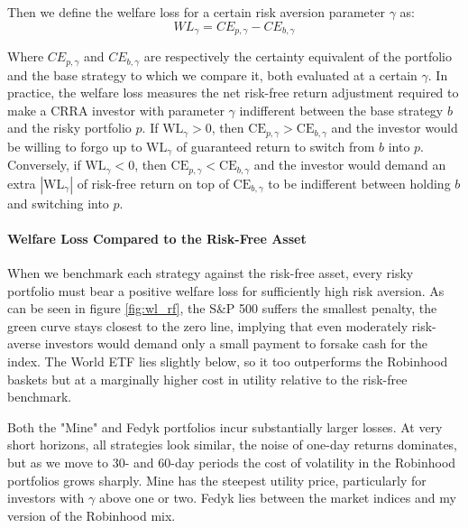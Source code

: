 Then we define the welfare loss for a certain risk aversion parameter $\gamma$ as:
\begin{equation}
    WL_{\gamma} = CE_{p, \gamma} - CE_{b, \gamma}
\end{equation}

Where $CE_{p, \gamma}$ and $CE_{b, \gamma}$ are respectively the certainty equivalent of the portfolio and the base strategy to which we compare it, both evaluated at a certain $\gamma$.
In practice, the welfare loss measures the net risk-free return adjustment required to make a CRRA investor with parameter $\gamma$ indifferent between the base strategy $b$ and the risky portfolio $p$. 
If $\mathrm{WL}_\gamma > 0$, then $\mathrm{CE}_{p,\gamma} > \mathrm{CE}_{b,\gamma}$ and the investor would be willing to forgo up to $\mathrm{WL}_\gamma$ of guaranteed return to switch from $b$ into $p$. 
Conversely, if $\mathrm{WL}_\gamma < 0$, then $\mathrm{CE}_{p,\gamma} < \mathrm{CE}_{b,\gamma}$ and the investor would demand an extra $|\mathrm{WL}_\gamma|$ of risk-free return on top of $\mathrm{CE}_{b,\gamma}$ to be indifferent between holding $b$ and switching into $p$.



\paragraph{Welfare Loss Compared to the Risk-Free Asset}
When we benchmark each strategy against the risk-free asset, every risky portfolio must bear a positive welfare loss for sufficiently high risk aversion. 
As can be seen in figure \ref{fig:wl_rf}, the S\&P 500 suffers the smallest penalty, the green curve stays closest to the zero line, implying that even moderately risk-averse investors would demand only a small payment to forsake cash for the index. 
The World ETF lies slightly below, so it too outperforms the Robinhood baskets but at a marginally higher cost in utility relative to the risk-free benchmark.

Both the "Mine" and Fedyk portfolios incur substantially larger losses.
At very short horizons, all strategies look similar, the noise of one-day returns dominates, but as we move to 30- and 60-day periods the cost of volatility in the Robinhood portfolios grows sharply. 
Mine has the steepest utility price, particularly for investors with $\gamma$ above one or two. 
Fedyk lies between the market indices and my version of the Robinhood mix.

